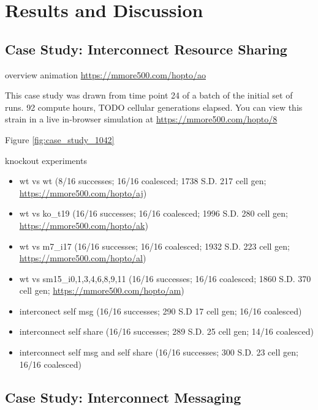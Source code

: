 \section{Results and Discussion} \label{sec:results}









% 

\subsection{Case Study: Interconnect Resource Sharing}



overview animation \url{https://mmore500.com/hopto/ao}

This case study was drawn from time point 24 of a batch of the initial set of runs.
92 compute hours, TODO cellular generations elapsed.
You can view this strain in a live in-browser simulation at \url{https://mmore500.com/hopto/8}

Figure \ref{fig:case_study_1042}

knockout experiments
\begin{itemize}
  \item wt vs wt (8/16 successes; 16/16 coalesced; 1738 S.D. 217 cell gen; \url{https://mmore500.com/hopto/aj})
  \item wt vs ko\_t19 (16/16 successes; 16/16 coalesced; 1996 S.D. 280 cell gen; \url{https://mmore500.com/hopto/ak})
  \item wt vs m7\_i17 (16/16 successes; 16/16 coalesced; 1932 S.D. 223 cell gen;  \url{https://mmore500.com/hopto/al})
  \item wt vs sm15\_i0,1,3,4,6,8,9,11 (16/16 successes; 16/16 coalesced; 1860 S.D. 370 cell gen; \url{https://mmore500.com/hopto/am})
  \item interconect self msg (16/16 successes; 290 S.D 17 cell gen; 16/16 coalesced)
  \item interconnect self share (16/16 successes; 289 S.D. 25 cell gen;  14/16 coalesced)
  \item interconnect self msg and self share (16/16 successes; 300 S.D. 23 cell gen; 16/16 coalesced)
\end{itemize}

\subsection{Case Study: Interconnect Messaging}

